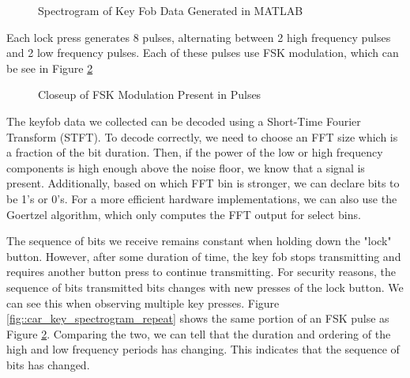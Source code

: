 \documentclass{article}
\begin{document}
\begin{figure}[H]
	\centerline{}
	\caption{Spectrogram of Key Fob Data Generated in MATLAB}
	\label{fig::car_key_spectrogram}
\end{figure}

Each lock press generates 8 pulses, alternating between 2 high frequency pulses and 2 low frequency pulses. Each of these pulses use FSK modulation, which can be see in Figure \ref{fig::car_key_spectrogram_focus}

\begin{figure}[H]
	\centerline{}
	\caption{Closeup of FSK Modulation Present in Pulses}
	\label{fig::car_key_spectrogram_focus}
\end{figure}

The keyfob data we collected can be decoded using a Short-Time Fourier Transform (STFT). To decode correctly, we need to choose an FFT size which is a fraction of the bit duration. Then, if the power of the low or high frequency components is high enough above the noise floor, we know that a signal is present. Additionally, based on which FFT bin is stronger, we can declare bits to be 1's or 0's. For a more efficient hardware implementations, we can also use the Goertzel algorithm, which only computes the FFT output for select bins. 

The sequence of bits we receive remains constant when holding down the "lock" button. However, after some duration of time, the key fob stops transmitting and requires another button press to continue transmitting. For security reasons, the sequence of bits transmitted bits changes with new presses of the lock button. We can see this when observing multiple key presses. Figure \ref{fig::car_key_spectrogram_repeat} shows the same portion of an FSK pulse as Figure \ref{fig::car_key_spectrogram_focus}. Comparing the two, we can tell that the duration and ordering of the high and low frequency periods has changing. This indicates that the sequence of bits has changed.
\end{document}
